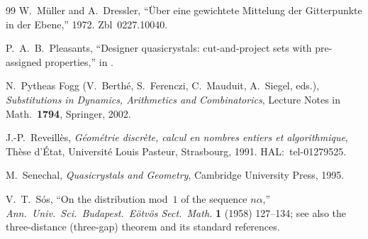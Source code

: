 \documentclass[11pt]{article}
\theoremstyle{plain}
\theoremstyle{remark}
\begin{document}
\begin{thebibliography}{99}
W.~M\"uller and A.~Dressler,
``\"Uber eine gewichtete Mittelung der Gitterpunkte in der Ebene,''
1972.
Zbl~0227.10040.

P.~A.~B.~Pleasants,
``Designer quasicrystals: cut-and-project sets with pre-assigned properties,''
in \cite{BaakeMoody2000}.

N.~Pytheas Fogg (V.~Berth\'e, S.~Ferenczi, C.~Mauduit, A.~Siegel, eds.),
\emph{Substitutions in Dynamics, Arithmetics and Combinatorics},
Lecture Notes in Math.\ \textbf{1794}, Springer, 2002.

J.-P.~Reveill\`es,
\emph{G\'eom\'etrie discr\`ete, calcul en nombres entiers et algorithmique},
Th\`ese d'\'Etat, Universit\'e Louis Pasteur, Strasbourg, 1991.
HAL:~tel-01279525.

M.~Senechal,
\emph{Quasicrystals and Geometry},
Cambridge University Press, 1995.

V.~T.~S\'os,
``On the distribution mod~$1$ of the sequence $n\alpha$,''
\emph{Ann.\ Univ.\ Sci.\ Budapest.\ E\"otv\"os Sect.\ Math.} \textbf{1} (1958) 127--134;
see also the three-distance (three-gap) theorem and its standard references.

\end{thebibliography}
\end{document}
